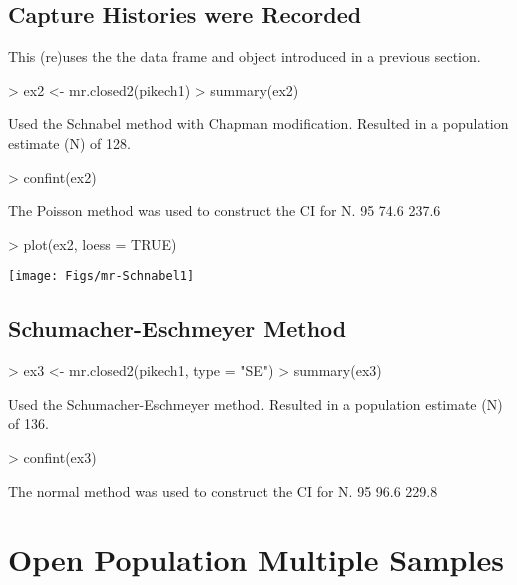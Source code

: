 \documentclass[a4paper]{article}
\begin{document}
\subsection{Capture Histories were Recorded}
This (re)uses the the  data frame and  object introduced in a previous section.
\begin{Schunk}
\begin{Sinput}
> ex2 <- mr.closed2(pikech1)
> summary(ex2)
\end{Sinput}
\begin{Soutput}
Used the Schnabel method with Chapman modification.
Resulted in a population estimate (N) of 128.
\end{Soutput}
\begin{Sinput}
> confint(ex2)
\end{Sinput}
\begin{Soutput}
The Poisson method was used to construct the CI for N.
 95% LCI 95% UCI
    74.6   237.6
\end{Soutput}
\begin{Sinput}
> plot(ex2, loess = TRUE)
\end{Sinput}
\end{Schunk}
\texttt{[image: Figs/mr-Schnabel1]}

\subsection{Schumacher-Eschmeyer Method}
\begin{Schunk}
\begin{Sinput}
> ex3 <- mr.closed2(pikech1, type = "SE")
> summary(ex3)
\end{Sinput}
\begin{Soutput}
Used the Schumacher-Eschmeyer method.
Resulted in a population estimate (N) of 136.
\end{Soutput}
\begin{Sinput}
> confint(ex3)
\end{Sinput}
\begin{Soutput}
The normal method was used to construct the CI for N.
 95% LCI 95% UCI
    96.6   229.8
\end{Soutput}
\end{Schunk}

\section{Open Population Multiple Samples}
\end{document}
